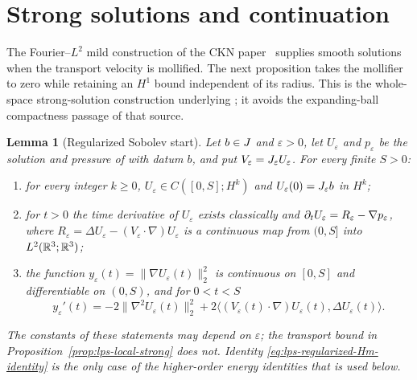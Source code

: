 \documentclass[11pt,letterpaper]{article}
\numberwithin{equation}{section}
\theoremstyle{plain}
\newtheorem{lemma}[theorem]{Lemma}
\theoremstyle{definition}
\theoremstyle{remark}
\begin{document}
\section{Strong solutions and continuation}\label{sec:lps-strong}

The Fourier--$L^2$ mild construction of the CKN paper~\cite{CKNLean} supplies smooth solutions
when the transport velocity is mollified. The next proposition takes the
mollifier to zero while retaining an $H^1$ bound independent of its
radius. This is the whole-space strong-solution construction underlying
\cite[Theorem~6.15, printed pp.~144--145]{RobinsonRodrigoSadowski2016};
it avoids the expanding-ball compactness passage of that source.

\begin{lemma}[Regularized Sobolev start]\label{lem:lps-regularized-Hk-start}
Let $b\in J$ and $\varepsilon>0$, let $U_\varepsilon$ and $p_\varepsilon$ be the
solution and pressure of \cite[Theorem~9.4]{CKNLean} with datum $b$, and
put $V_\varepsilon=J_\varepsilon U_\varepsilon$. For every finite $S>0$:
\begin{enumerate}[label=(\alph*)]
\item for every integer $k\ge0$, $U_\varepsilon\in C([0,S];H^k)$ and
$U_\varepsilon(0)=J_\varepsilon b$ in $H^k$;
\item for $t>0$ the time derivative of $U_\varepsilon$ exists classically and
$\partial_t U_\varepsilon=R_\varepsilon-\nabla p_\varepsilon$, where
$R_\varepsilon=\Delta U_\varepsilon-(V_\varepsilon\cdot\nabla)U_\varepsilon$
is a continuous map from $(0,S]$ into $L^2(\mathbb{R}^3;\mathbb{R}^3)$;
\item the function $y_\varepsilon(t)=\|\nabla U_\varepsilon(t)\|_2^2$ is
continuous on $[0,S]$ and differentiable on $(0,S)$, and for $0<t<S$
\begin{equation}\label{eq:lps-regularized-Hm-identity}
y_\varepsilon'(t)
=-2\|\nabla^2U_\varepsilon(t)\|_2^2
 +2\big\langle(V_\varepsilon(t)\cdot\nabla)U_\varepsilon(t),
   \Delta U_\varepsilon(t)\big\rangle .
\end{equation}
\end{enumerate}
The constants of these statements may depend on $\varepsilon$; the transport
bound in Proposition~\ref{prop:lps-local-strong} does not. Identity
\eqref{eq:lps-regularized-Hm-identity} is the only case of the
higher-order energy identities that is used below.
\end{lemma}
\end{document}
